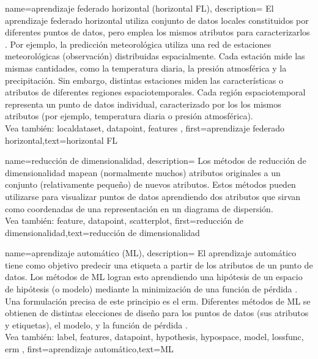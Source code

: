 {name={aprendizaje federado horizontal (horizontal FL)},
	description={
		El aprendizaje federado horizontal utiliza conjunto de datos locales constituidos por diferentes
		puntos de datos, pero emplea los mismos atributos para caracterizarlos \cite{HFLChapter2020}.
		Por ejemplo, la predicción meteorológica utiliza una red de estaciones meteorológicas
		(observación) distribuidas espacialmente. Cada estación mide las mismas cantidades, como
		la temperatura diaria, la presión atmosférica y la precipitación. Sin embargo,
		distintas estaciones miden las características o atributos de diferentes regiones espaciotemporales.
		Cada región espaciotemporal representa un punto de datos individual, caracterizado por los los mismos atributos
		(por ejemplo, temperatura diaria o presión atmosférica).
		\\
			Vea también: \gls{localdataset}, \gls{datapoint}, \gls{feature}s },
	first={aprendizaje federado horizontal},text={horizontal FL}
}

{name={reducción de dimensionalidad},
	description={
		Los métodos de reducción de dimensionalidad
		mapean (normalmente muchos) atributos originales a un conjunto (relativamente pequeño) de
		nuevos atributos. Estos métodos pueden utilizarse para visualizar puntos de datos
		aprendiendo dos atributos que sirvan como coordenadas de una representación
		en un diagrama de dispersión.
		\\
		Vea también: \gls{feature}, \gls{datapoint}, \gls{scatterplot}},
	first={reducción de dimensionalidad},text={reducción de dimensionalidad}
}



{name={aprendizaje automático (ML)},
	description={
		El aprendizaje automático tiene como objetivo predecir
		una etiqueta a partir de los atributos de un punto de datos. Los métodos de ML logran esto
		aprendiendo una hipótesis de un espacio de hipótesis (o modelo)
		mediante la minimización de una función de pérdida \cite{MLBasics,HastieWainwrightBook}.
		Una formulación precisa de este principio es el \gls{erm}.
		Diferentes métodos de ML se obtienen de distintas elecciones de diseño para los
		puntos de datos (sus atributos y etiquetas),
		el modelo, y la función de pérdida \cite[Cap. 3]{MLBasics}.
		\\
		Vea también: \gls{label}, \gls{feature}s, \gls{datapoint}, \gls{hypothesis}, \gls{hypospace}, \gls{model}, \gls{lossfunc}, \gls{erm} },
	first={aprendizaje automático},text={ML}
}


